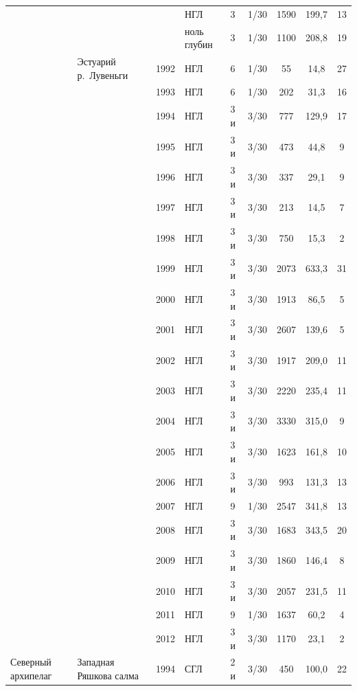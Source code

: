 \documentclass[12pt, a4paper]{disser}
\begin{document}
\begin{footnotesize}
\begin{longtable}{|p{2cm}|p{3cm}|p{1cm}|p{2cm}|p{1.5cm}|p{1cm}|*{3}{c|}}
		 &  &  & НГЛ & 3 & 1/30 & 1590 & 199,7 & 13
		\\ \cline{4-9}
		 &  &  & ноль глубин & 3 & 1/30 & 1100 & 208,8 & 19
		\\ \cline{2-9}
	 & Эстуарий р.~Лувень\-ги & 1992 & НГЛ & 6 & 1/30 & 55 & 14,8 & 27
		\\ \cline{3-9}
		 &  & 1993 & НГЛ & 6 & 1/30 & 202 & 31,3 & 16
		\\ \cline{3-9}
		 &  & 1994 & НГЛ & 3 и & 3/30 & 777 & 129,9 & 17
		\\ \cline{3-9}
		 &  & 1995 & НГЛ & 3 и & 3/30 & 473 & 44,8 & 9
		\\ \cline{3-9}
		 &  & 1996 & НГЛ & 3 и & 3/30 & 337 & 29,1 & 9
		\\ \cline{3-9}
		 &  & 1997 & НГЛ & 3 и & 3/30 & 213 & 14,5 & 7
		\\ \cline{3-9}
		 &  & 1998 & НГЛ & 3 и & 3/30 & 750 & 15,3 & 2
		\\ \cline{3-9}
		 &  & 1999 & НГЛ & 3 и & 3/30 & 2073 & 633,3 & 31
		\\ \cline{3-9}
		 &  & 2000 & НГЛ & 3 и & 3/30 & 1913 & 86,5 & 5
		\\ \cline{3-9}
		 &  & 2001 & НГЛ & 3 и & 3/30 & 2607 & 139,6 & 5
		\\ \cline{3-9}
		 &  & 2002 & НГЛ & 3 и & 3/30 & 1917 & 209,0 & 11
		\\ \cline{3-9}
		 &  & 2003 & НГЛ & 3 и & 3/30 & 2220 & 235,4 & 11
		\\ \cline{3-9}
		 &  & 2004 & НГЛ & 3 и & 3/30 & 3330 & 315,0 & 9
		\\ \cline{3-9}
		 &  & 2005 & НГЛ & 3 и & 3/30 & 1623 & 161,8 & 10
		\\ \cline{3-9}
		 &  & 2006 & НГЛ & 3 и & 3/30 & 993 & 131,3 & 13
		\\ \cline{3-9}
		 &  & 2007 & НГЛ & 9 & 1/30 & 2547 & 341,8 & 13
		\\ \cline{3-9}
		 &  & 2008 & НГЛ & 3 и & 3/30 & 1683 & 343,5 & 20
		\\ \cline{3-9}
		 &  & 2009 & НГЛ & 3 и & 3/30 & 1860 & 146,4 & 8
		\\ \cline{3-9}
		 &  & 2010 & НГЛ & 3 и & 3/30 & 2057 & 231,5 & 11
		\\ \cline{3-9}
		 &  & 2011 & НГЛ & 9 & 1/30 & 1637 & 60,2 & 4
		\\ \cline{3-9}
		 &  & 2012 & НГЛ & 3 и & 3/30 & 1170 & 23,1 & 2
		\\ \hline
	Северный архипелаг & Западная Ряшкова салма & 1994 & СГЛ & 2 и & 3/30 & 450 & 100,0 & 22
		\\ \cline{3-9}

\end{longtable}
\end{footnotesize}
\end{document}
